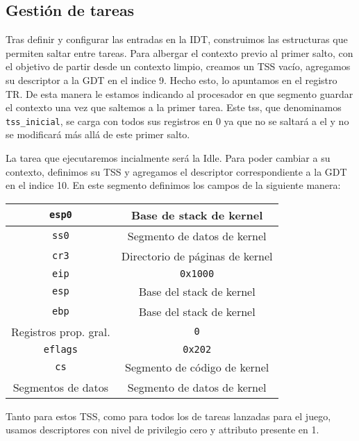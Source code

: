 \subsection{Gestión de tareas}

Tras definir y configurar las entradas en la IDT, construimos las estructuras que permiten saltar entre tareas.
Para albergar el contexto previo al primer salto, con el objetivo de partir desde un contexto limpio, creamos un TSS vacío, agregamos su descriptor a la GDT en el indice 9.
Hecho esto, lo apuntamos en el registro TR. De esta manera le estamos indicando al procesador en que segmento guardar el contexto una vez que saltemos a la primer tarea. 
Este tss, que denominamos \verb|tss_inicial|, se carga con todos sus registros en 0 ya que no se saltará a el y no se modificará más allá de este primer salto.

La tarea que ejecutaremos incialmente será la Idle. Para poder cambiar a su contexto, definimos su TSS y agregamos el descriptor correspondiente a la GDT en el indice 10.
En este segmento definimos los campos de la siguiente manera:


\begin{center}
\begin{tabular}{ |c| c | }
\hline
\verb|esp0| & Base de stack de kernel\\
\hline
\verb|ss0|  & Segmento de datos de kernel\\
\hline
\verb|cr3|  & Directorio de páginas de kernel\\
\hline
\verb|eip|  & \verb|0x1000|\\
\hline
\verb|esp|  & Base del stack de kernel\\
\hline
\verb|ebp|  & Base del stack de kernel\\
\hline
Registros prop. gral. & \verb|0|\\
\hline
\verb|eflags| & \verb|0x202|\\
\hline
\verb|cs| & Segmento de código de kernel\\
\hline
Segmentos de datos & Segmento de datos de kernel\\
\hline
\end{tabular}
\end{center}



Tanto para estos TSS, como para todos los de tareas lanzadas para el juego, usamos descriptores con nivel de privilegio cero y attributo presente en 1.\\\textbf{}

